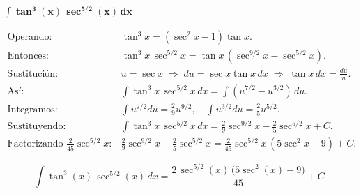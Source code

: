 $\displaystyle \mathbf{\int \tan^{3}\!(x)\,\sec^{5/2}\!(x)\,dx}$

\nopagebreak
$$
\begin{aligned}
\text{Operando: } &
\tan^{3}x = (\sec^{2}x - 1)\tan x. \\[6pt]
\text{Entonces: } &
\tan^{3}x\,\sec^{5/2}x
= \tan x\,(\sec^{9/2}x - \sec^{5/2}x). \\[6pt]
\text{Sustitución: } &
u = \sec x \;\Rightarrow\; du = \sec x\tan x\,dx 
\;\Rightarrow\; \tan x\,dx = \frac{du}{u}. \\[6pt]
\text{Así: } &
\int \tan^{3}x\,\sec^{5/2}x\,dx
= \int (u^{7/2} - u^{3/2})\,du. \\[6pt]
\text{Integramos: } &
\int u^{7/2}du = \frac{2}{9}u^{9/2}, \quad
\int u^{3/2}du = \frac{2}{5}u^{5/2}. \\[6pt]
\text{Sustituyendo: } &
\int \tan^{3}x\,\sec^{5/2}x\,dx
= \frac{2}{9}\sec^{9/2}x - \frac{2}{5}\sec^{5/2}x + C. \\[8pt]
\text{Factorizando } \frac{2}{45}\sec^{5/2}x: &
\frac{2}{9}\sec^{9/2}x - \frac{2}{5}\sec^{5/2}x
= \frac{2}{45}\sec^{5/2}x\,(5\sec^{2}x - 9) + C.
\end{aligned}
$$

$$
\boxed{\displaystyle 
\int \tan^{3}\!(x)\,\sec^{5/2}\!(x)\,dx
= \frac{2\,\sec^{5/2}\!(x)\,\big(5\sec^{2}\!(x) - 9\big)}{45} + C}
$$
